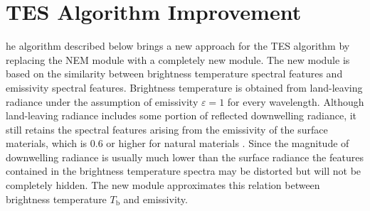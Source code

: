 \section{TES Algorithm Improvement}

he algorithm described below brings a new approach for the TES algorithm by replacing the NEM module with a completely new module. The new module is based on the similarity between brightness temperature spectral features and emissivity spectral features. Brightness temperature is obtained from land-leaving radiance under the assumption of emissivity $\varepsilon=1$ for every wavelength. Although land-leaving radiance includes some portion of reflected downwelling radiance, it still retains the spectral features arising from the emissivity of the surface materials, which is $0.6$ or higher for natural materials \cite{GR98}. Since the magnitude of downwelling radiance is usually much lower than the surface radiance the features contained in the brightness temperature spectra may be distorted but will not be completely hidden. The new module approximates this relation between brightness temperature $T_\mathrm{b}$ and emissivity.

